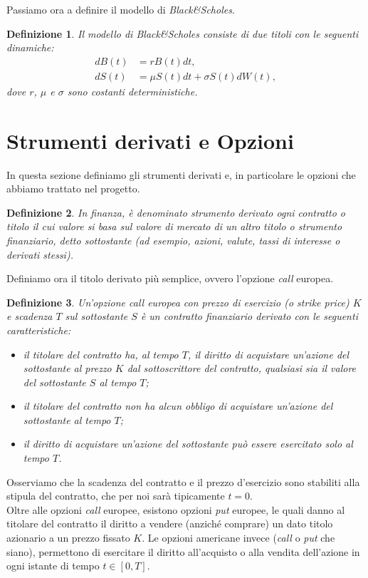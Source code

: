 \documentclass[a4paper,10pt]{report}
\newtheorem{definition}{Definizione}[chapter]
\theoremstyle{osservazione}
\theoremstyle{esempio}
\theoremstyle{notazione}
\theoremstyle{corollario}
\begin{document}
Passiamo ora a definire il modello di \emph{Black\&Scholes}.
\begin{definition}
Il modello di \emph{Black\&Scholes} consiste di due titoli con le seguenti dinamiche:
\begin{align*}
dB(t)&=rB(t)dt,\\
dS(t)&=\mu S(t)dt+\sigma S(t)dW(t),
\end{align*}
dove $r$, $\mu$ e $\sigma$ sono costanti deterministiche.
\end{definition}

\section{Strumenti derivati e Opzioni}
In questa sezione definiamo gli strumenti derivati e, in particolare le opzioni che abbiamo trattato nel progetto.
\begin{definition}
In finanza, \`e denominato strumento derivato ogni contratto o titolo il cui valore si basa sul valore di mercato di un altro titolo o strumento finanziario, detto sottostante (ad esempio, azioni, valute, tassi di interesse o derivati stessi).
\end{definition}
Definiamo ora il titolo derivato pi\`u semplice, ovvero l'opzione \emph{call} europea.
\begin{definition}
Un'opzione \emph{call} europea con prezzo di esercizio (o \emph{strike price}) $K$ e scadenza $T$ sul sottostante $S$ \`e un contratto finanziario derivato con le seguenti caratteristiche:
\begin{itemize}
\item il titolare del contratto ha, al tempo $T$, il diritto di acquistare un'azione del sottostante al prezzo $K$ dal sottoscrittore del contratto, qualsiasi sia il valore del sottostante $S$ al tempo $T$;
\item il titolare del contratto non ha alcun obbligo di acquistare un'azione del sottostante al tempo $T$;
\item il diritto di acquistare un'azione del sottostante pu\`o essere esercitato solo al tempo $T$.
\end{itemize}
\end{definition}
Osserviamo che la scadenza del contratto e il prezzo d'esercizio sono stabiliti alla stipula del contratto, che per noi sar\`a tipicamente $t=0$.\\Oltre alle opzioni \emph{call} europee, esistono opzioni \emph{put} europee, le quali danno al titolare del contratto il diritto a vendere (anzich\'e comprare) un dato titolo azionario a un prezzo fissato $K$. Le opzioni americane invece (\emph{call} o \emph{put} che siano), permettono di esercitare il diritto all'acquisto o alla vendita dell'azione in ogni istante di tempo $t\in[0,T]$.
\end{document}
